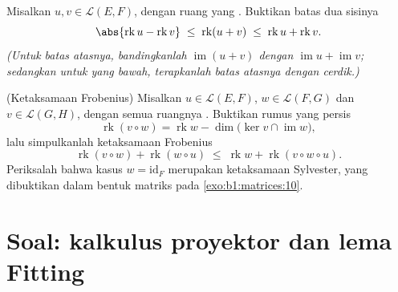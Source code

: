 \begin{exercise}[$\star\star$]\label{exo:b1:linmaps:11}
Misalkan $u, v \in \mathcal{L}(E, F)$, dengan ruang yang .
Buktikan batas dua sisinya
\[
\abs{\operatorname{rk} u - \operatorname{rk} v}
\;\leq\; \operatorname{rk}(u + v)
\;\leq\; \operatorname{rk} u + \operatorname{rk} v .
\]
\emph{(Untuk batas atasnya, bandingkanlah $\operatorname{im}(u+v)$ dengan
$\operatorname{im} u + \operatorname{im} v$; sedangkan untuk yang bawah,
terapkanlah batas atasnya dengan cerdik.)}
\end{exercise}

\begin{exercise}[$\star\star\star$]\label{exo:b1:linmaps:12}
(Ketaksamaan Frobenius) Misalkan $u \in \mathcal{L}(E, F)$, $w \in
\mathcal{L}(F, G)$ dan $v \in \mathcal{L}(G, H)$, dengan semua ruangnya
. Buktikan rumus yang persis
\[
\operatorname{rk}(v \circ w) = \operatorname{rk} w -
\dim\bigl(\ker v \cap \operatorname{im} w\bigr),
\]
lalu simpulkanlah ketaksamaan Frobenius
\[
\operatorname{rk}(v \circ w) + \operatorname{rk}(w \circ u)
\;\leq\; \operatorname{rk} w + \operatorname{rk}(v \circ w \circ
u) .
\]
Periksalah bahwa kasus $w = \mathrm{id}_F$ merupakan ketaksamaan
Sylvester, yang dibuktikan dalam bentuk matriks pada \cref{exo:b1:matrices:10}.
\end{exercise}

\section{Soal: kalkulus proyektor dan lema Fitting}

